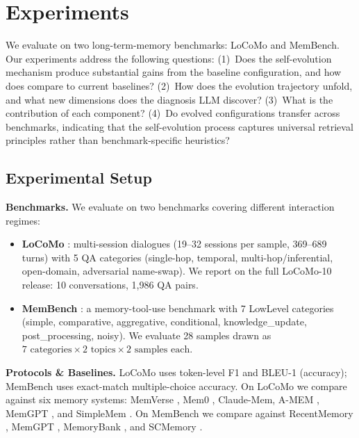 \section{Experiments}
\label{sec:experiments}

We evaluate \ours{} on two long-term-memory benchmarks: LoCoMo and MemBench. Our experiments address the following questions: (1)~Does the self-evolution mechanism produce substantial gains from the baseline configuration, and how does \ours{} compare to current baselines? (2)~How does the evolution trajectory unfold, and what new dimensions does the diagnosis LLM discover? (3)~What is the contribution of each component? (4)~Do evolved configurations transfer across benchmarks, indicating that the self-evolution process captures universal retrieval principles rather than benchmark-specific heuristics?

\subsection{Experimental Setup}
\label{sec:setup}

\noindent \textbf{Benchmarks.} We evaluate on two benchmarks covering different interaction regimes:

\begin{itemize}[leftmargin=*,itemsep=2pt]
    \item \textbf{LoCoMo} \citep{maharana2024evaluating}: multi-session dialogues (19--32 sessions per sample, 369--689 turns) with 5 QA categories (single-hop, temporal, multi-hop/inferential, open-domain, adversarial name-swap). We report on the full LoCoMo-10 release: 10 conversations, 1{,}986 QA pairs.
    \item \textbf{MemBench} \citep{membench2025}: a memory-tool-use benchmark with 7 LowLevel categories (simple, comparative, aggregative, conditional, knowledge\_update, post\_processing, noisy). We evaluate 28 samples drawn as $7\text{ categories}\times 2\text{ topics}\times 2\text{ samples each}$.
\end{itemize}


\noindent \textbf{Protocols \& Baselines.} LoCoMo uses token-level F1 and BLEU-1 (accuracy); MemBench uses exact-match multiple-choice accuracy. 
On LoCoMo we compare against six memory systems: MemVerse \citep{liu2025memverse}, Mem0 \citep{chhikara2025mem0}, Claude-Mem, A-MEM \citep{xu2025amem}, MemGPT \citep{packer2023memgpt}, and SimpleMem \citep{liu2026simplemem}. On MemBench we compare against RecentMemory  \citep{membench2025}, MemGPT \citep{packer2023memgpt}, MemoryBank \citep{zhong2024memorybank}, and SCMemory \citep{wang2024scm}. 

